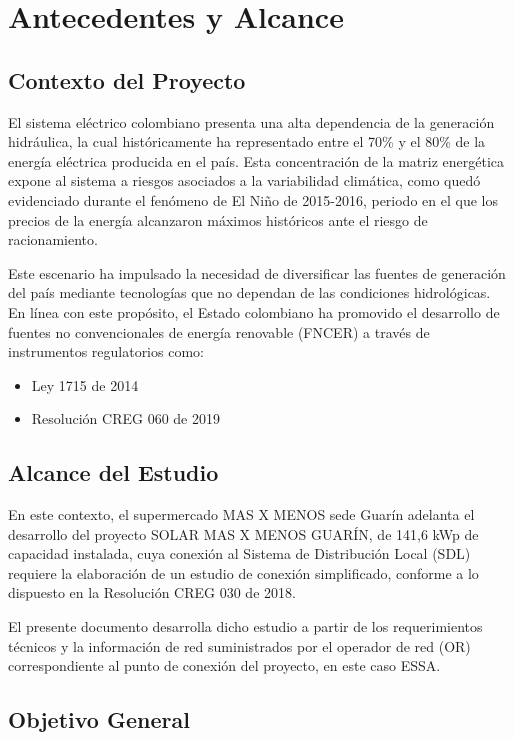 \chapter{Antecedentes y Alcance}

\section{Contexto del Proyecto}

El sistema eléctrico colombiano presenta una alta dependencia de la generación hidráulica, la cual históricamente ha representado entre el 70\% y el 80\% de la energía eléctrica producida en el país. Esta concentración de la matriz energética expone al sistema a riesgos asociados a la variabilidad climática, como quedó evidenciado durante el fenómeno de El Niño de 2015-2016, periodo en el que los precios de la energía alcanzaron máximos históricos ante el riesgo de racionamiento.

Este escenario ha impulsado la necesidad de diversificar las fuentes de generación del país mediante tecnologías que no dependan de las condiciones hidrológicas. En línea con este propósito, el Estado colombiano ha promovido el desarrollo de fuentes no convencionales de energía renovable (FNCER) a través de instrumentos regulatorios como:

\begin{itemize}
    \item Ley 1715 de 2014
    \item Resolución CREG 060 de 2019
\end{itemize}

\section{Alcance del Estudio}

En este contexto, el supermercado MAS X MENOS sede Guarín adelanta el desarrollo del proyecto SOLAR MAS X MENOS GUARÍN, de 141,6 kWp de capacidad instalada, cuya conexión al Sistema de Distribución Local (SDL) requiere la elaboración de un estudio de conexión simplificado, conforme a lo dispuesto en la Resolución CREG 030 de 2018.

El presente documento desarrolla dicho estudio a partir de los requerimientos técnicos y la información de red suministrados por el operador de red (OR) correspondiente al punto de conexión del proyecto, en este caso ESSA.

\section{Objetivo General}


